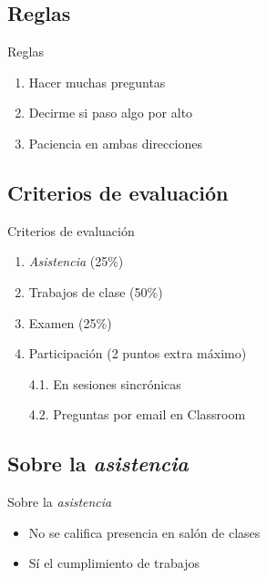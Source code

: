 \documentclass[
  11pt,
  ignorenonframetext,
]{beamer}
\begin{document}
\hypertarget{reglas}{%
\subsection{Reglas}\label{reglas}}

\begin{frame}{Reglas}
\begin{enumerate}
\item
  Hacer muchas preguntas
\item
  Decirme si paso algo por alto
\item
  Paciencia en ambas direcciones
\end{enumerate}
\end{frame}

\hypertarget{criterios-de-evaluaciuxf3n}{%
\subsection{Criterios de evaluación}\label{criterios-de-evaluaciuxf3n}}

\begin{frame}{Criterios de evaluación}
\begin{enumerate}
\item
  \emph{Asistencia} (25\%)
\item
  Trabajos de clase (50\%)
\item
  Examen (25\%)
\item
  Participación (2 puntos extra máximo)

  4.1. En sesiones sincrónicas

  4.2. Preguntas por email en Classroom
\end{enumerate}
\end{frame}

\hypertarget{sobre-la-asistencia}{%
\subsection{\texorpdfstring{Sobre la
\emph{asistencia}}{Sobre la asistencia}}\label{sobre-la-asistencia}}

\begin{frame}{Sobre la \emph{asistencia}}
\begin{itemize}
\item
  No se califica presencia en salón de clases
\item
  Sí el cumplimiento de trabajos
\end{itemize}
\end{frame}
\end{document}
